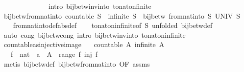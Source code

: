 \begin{isabellebody}
\ \ \ \ \ \ \ \ \ \ \ \ \ \ intro{\isacharcolon}\ bij{\isacharunderscore}betw{\isacharunderscore}inv{\isacharunderscore}into\ to{\isacharunderscore}nat{\isacharunderscore}on{\isacharunderscore}finite{\isacharparenright}\isanewline
\ \ \isamarkupfalse%
%
\endisatagproof
{\isafoldproof}%
%
\isadelimproof
\isanewline
%
\endisadelimproof
\isanewline
{}\isamarkupfalse%
\ bij{\isacharunderscore}betw{\isacharunderscore}from{\isacharunderscore}nat{\isacharunderscore}into{\isacharcolon}\ {\isachardoublequoteopen}countable\ S\ {\isasymLongrightarrow}\ infinite\ S\ {\isasymLongrightarrow}\ bij{\isacharunderscore}betw\ {\isacharparenleft}from{\isacharunderscore}nat{\isacharunderscore}into\ S{\isacharparenright}\ UNIV\ S{\isachardoublequoteclose}\isanewline
%
\isadelimproof
\ \ %
\endisadelimproof
%
\isatagproof
{}\isamarkupfalse%
\ from{\isacharunderscore}nat{\isacharunderscore}into{\isacharunderscore}def{\isacharbrackleft}abs{\isacharunderscore}def{\isacharbrackright}\isanewline
\ \ \isamarkupfalse%
\ to{\isacharunderscore}nat{\isacharunderscore}on{\isacharunderscore}infinite{\isacharbrackleft}of\ S{\isacharcomma}\ unfolded\ bij{\isacharunderscore}betw{\isacharunderscore}def{\isacharbrackright}\isanewline
\ \ \isamarkupfalse%
\ {\isacharparenleft}auto\ cong{\isacharcolon}\ bij{\isacharunderscore}betw{\isacharunderscore}cong\ intro{\isacharcolon}\ bij{\isacharunderscore}betw{\isacharunderscore}inv{\isacharunderscore}into\ to{\isacharunderscore}nat{\isacharunderscore}on{\isacharunderscore}infinite{\isacharparenright}%
\endisatagproof
{\isafoldproof}%
%
\isadelimproof
\isanewline
%
\endisadelimproof
\isanewline
{}\isamarkupfalse%
\ countable{\isacharunderscore}as{\isacharunderscore}injective{\isacharunderscore}image{\isacharcolon}\isanewline
\ \ \ {\isachardoublequoteopen}countable\ A{\isachardoublequoteclose}\ {\isachardoublequoteopen}infinite\ A{\isachardoublequoteclose}\isanewline
\ \ \ f\ {\isacharcolon}{\isacharcolon}\ {\isachardoublequoteopen}nat\ {\isasymRightarrow}\ {\isacharprime}a{\isachardoublequoteclose}\ \ {\isachardoublequoteopen}A\ {\isacharequal}\ range\ f{\isachardoublequoteclose}\ {\isachardoublequoteopen}inj\ f{\isachardoublequoteclose}\isanewline
%
\isadelimproof
%
\endisadelimproof
%
\isatagproof
{}\isamarkupfalse%
\ {\isacharparenleft}metis\ bij{\isacharunderscore}betw{\isacharunderscore}def\ bij{\isacharunderscore}betw{\isacharunderscore}from{\isacharunderscore}nat{\isacharunderscore}into\ {\isacharbrackleft}OF\ assms{\isacharbrackright}{\isacharparenright}%

\end{isabellebody}
